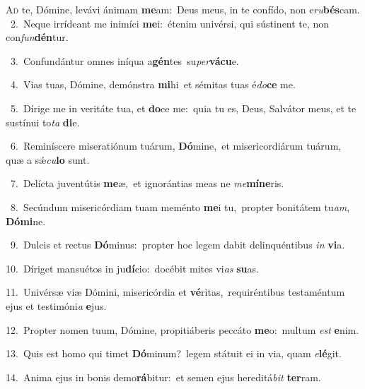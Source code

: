 \lettrine{\initial\textcolor{\initialcolor}{A}}{d} te, Dómine, levávi ánimam \textbf{me}\-am:~\star Deus meus, in te confído, non e\-\textit{ru}\-\textbf{bés}cam.\\
{\numbfont\textcolor{\numbcolor}{~2.}}~Neque irrídeant me inimíci \textbf{me}\-i:~\star étenim univérsi, qui sústinent te, non con\-\textit{fun}\-\textbf{dén}tur.\par
{\numbfont\textcolor{\numbcolor}{~3.}}~Confundántur omnes iníqua a\-\textbf{gén}\-tes~\star su\-\textit{per}\-\textbf{vá}\textbf{cu}e.\par
{\numbfont\textcolor{\numbcolor}{~4.}}~Vias tuas, Dómine, demónstra \textbf{mi}\-hi~\star et sémitas tuas é\-\textit{do}\-\textbf{ce} me.\par
{\numbfont\textcolor{\numbcolor}{~5.}}~Dírige me in veritáte tua, et \textbf{do}\-ce me:~\star quia tu es, Deus, Salvátor meus, et te sustínui to\textit{ta} \textbf{di}\-e.\par
{\numbfont\textcolor{\numbcolor}{~6.}}~Reminíscere miseratiónum tuárum, \textbf{Dó}\-mine,~\star et misericordiárum tuárum, quæ a sǽ\-\textit{cu}\-\textbf{lo} sunt.\par
{\numbfont\textcolor{\numbcolor}{~7.}}~Delícta juventútis \textbf{me}\-æ,~\star et ignorántias meas ne \textit{me}\-\textbf{mí}\textbf{ne}ris.\par
{\numbfont\textcolor{\numbcolor}{~8.}}~Secúndum misericórdiam tuam meménto \textbf{me}\-i tu,~\star propter bonitátem tu\-\textit{am}\-, \textbf{Dó}\-\textbf{mi}ne.\par
{\numbfont\textcolor{\numbcolor}{~9.}}~Dulcis et rectus \textbf{Dó}\-minus:~\star propter hoc legem dabit delinquéntibus \textit{in} \textbf{vi}\-a.\par
{\numbfont\textcolor{\numbcolor}{10.}}~Díriget mansuétos in ju\-\textbf{dí}\-cio:~\star docébit mites vi\textit{as} \textbf{su}\-as.\par
{\numbfont\textcolor{\numbcolor}{11.}}~Univérsæ viæ Dómini, misericórdia et \textbf{vé}\-ritas,~\star requiréntibus testaméntum ejus et testimóni\textit{a} \textbf{e}\-jus.\par
{\numbfont\textcolor{\numbcolor}{12.}}~Propter nomen tuum, Dómine, propitiáberis peccáto \textbf{me}\-o:~\star multum \textit{est} \textbf{e}\-nim.\par
{\numbfont\textcolor{\numbcolor}{13.}}~Quis est homo qui timet \textbf{Dó}\-minum?~\star legem státuit ei in via, quam \textit{e}\-\textbf{lé}git.\par
{\numbfont\textcolor{\numbcolor}{14.}}~Anima ejus in bonis demo\-\textbf{rá}\-bitur:~\star et semen ejus hereditá\textit{bit} \textbf{ter}\-ram.\par
